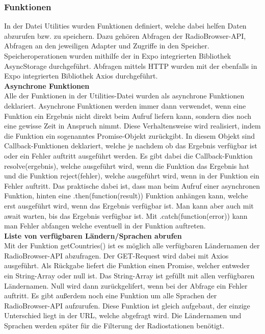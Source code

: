 \documentclass[]{article}
\begin{document}
\subsubsection{Funktionen}
In der Datei Utilities wurden Funktionen definiert, welche dabei helfen Daten abzurufen bzw. zu speichern. Dazu gehören Abfragen der RadioBrowser-API, Abfragen an den jeweiligen Adapter und Zugriffe in den Speicher. Speicheroperationen wurden mithilfe der in Expo integrierten Bibliothek \glqq AsyncStorage \grqq{}  durchgeführt. Abfragen mittels HTTP wurden mit der ebenfalls in Expo integrierten Bibliothek \glqq Axios \grqq{} durchgeführt. \newline \\
\textbf{Asynchrone Funktionen} \\
Alle der Funktionen in der Utilities-Datei wurden als asynchrone Funktionen deklariert. Asynchrone Funktionen werden immer dann verwendet, wenn eine Funktion ein Ergebnis nicht direkt beim Aufruf liefern kann, sondern dies noch eine gewisse Zeit in Anspruch nimmt. Diese Verhaltensweise wird realisiert, indem die Funktion ein sogenanntes Promise-Objekt zurückgibt. In diesem Objekt sind Callback-Funktionen deklariert, welche je nachdem ob das Ergebnis verfügbar ist oder ein Fehler auftritt ausgeführt werden. Es gibt dabei die Callback-Funktion resolve(ergebnis), welche ausgeführt wird, wenn die Funktion das Ergebnis hat und die Funktion reject(fehler), welche ausgeführt wird, wenn in der Funktion ein Fehler auftritt. Das praktische dabei ist, dass man beim Aufruf einer asynchronen Funktion, hinten eine .then(function(result)) Funktion anhängen kann, welche erst ausgeführt wird, wenn das Ergebnis verfügbar ist. Man kann aber auch mit await warten, bis das Ergebnis verfügbar ist. Mit .catch(function(error)) kann man Fehler abfangen welche eventuell in der Funktion auftreten. \newline \\
\textbf{Liste von verfügbaren Ländern/Sprachen abrufen} \\
Mit der Funktion getCountries() ist es möglich alle verfügbaren Ländernamen der RadioBrowser-API abzufragen. Der GET-Request wird dabei mit Axios ausgeführt. Als Rückgabe liefert die Funktion einen Promise, welcher entweder ein String-Array oder null ist. Das String-Array ist gefüllt mit allen verfügbaren Ländernamen. Null wird dann zurückgelifert, wenn bei der Abfrage ein Fehler auftritt. Es gibt außerdem noch eine Funktion um alle Sprachen der RadioBrowser-API aufzurufen. Diese Funktion ist gleich aufgebaut, der einzige Unterschied liegt in der URL, welche abgefragt wird. Die Ländernamen und Sprachen werden später für die Filterung der Radiostationen benötigt. \newline \\
\end{document}

